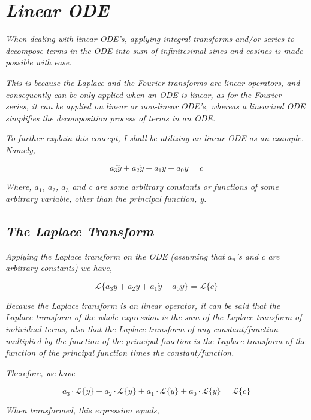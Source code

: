 

\section{\textit{Linear ODE}}

	\textit{When dealing with linear ODE's, applying integral transforms and/or series to decompose terms in the ODE into sum of infinitesimal sines and cosines is made possible with ease.} 
	
	\textit{This is because the Laplace and the Fourier transforms are linear operators, and consequently can be only applied when an ODE is linear, as for the Fourier series, it can be applied on linear or non-linear ODE's, whereas a linearized ODE simplifies the decomposition process of terms in an ODE.}

	\textit{To further explain this concept, I shall be utilizing an linear ODE as an example. Namely,}
	
		$$a_3\dddot{y} + a_2\ddot{y} + a_1\dot{y} + a_0y = c$$

	\textit{Where, $a_1$, $a_2$, $a_3$ and c are some arbitrary constants or functions of some arbitrary variable, other than the principal function, y.}

	\subsection{\textit{The Laplace Transform}}	
		
		\textit{Applying the Laplace transform on the ODE (assuming that $a_n$'s and c are arbitrary constants) we have,}
		
			$$\mathcal{L}\{a_3\dddot{y} + a_2\ddot{y} + a_1\dot{y} + a_0y\} = \mathcal{L}\{c\}$$		
			
		\textit{Because the Laplace transform is an linear operator, it can be said that the Laplace transform of the whole expression is the sum of the Laplace transform of individual terms, also that the Laplace transform of any constant/function multiplied by the function of the principal function is the Laplace transform of the function of the principal function times the constant/function.}			
			
		\textit{Therefore, we have}			
			
			$$a_3\cdot\mathcal{L}\{\dddot{y}\} + a_2\cdot\mathcal{L}\{\ddot{y}\} + a_1\cdot\mathcal{L}\{\dot{y}\} + a_0\cdot\mathcal{L}\{y\} = \mathcal{L}\{c\}$$
		
		\textit{When transformed, this expression equals,}		
		
